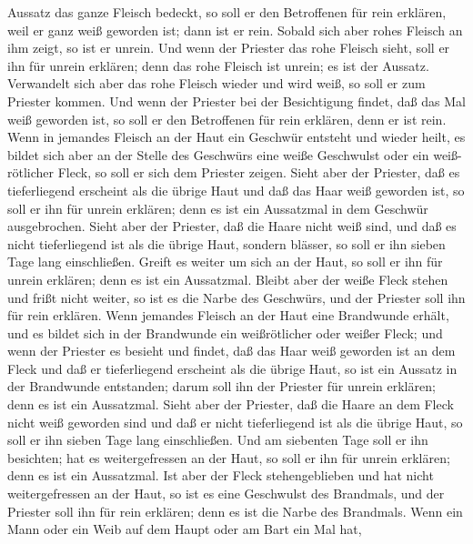 Aussatz das ganze Fleisch bedeckt, so soll er den Betroffenen für rein
erklären, weil er ganz weiß geworden ist; dann ist er rein.
 Sobald sich aber rohes Fleisch an ihm zeigt, so ist er
unrein.  Und wenn der Priester das rohe Fleisch sieht,
soll er ihn für unrein erklären; denn das rohe Fleisch ist unrein; es
ist der Aussatz.  Verwandelt sich aber das rohe Fleisch
wieder und wird weiß, so soll er zum Priester kommen. 
Und wenn der Priester bei der Besichtigung findet, daß das Mal weiß
geworden ist, so soll er den Betroffenen für rein erklären, denn er ist
rein.  Wenn in jemandes Fleisch an der Haut ein Geschwür
entsteht und wieder heilt,  es bildet sich aber an der
Stelle des Geschwürs eine weiße Geschwulst oder ein weiß-rötlicher
Fleck, so soll er sich dem Priester zeigen.  Sieht aber
der Priester, daß es tieferliegend erscheint als die übrige Haut und daß
das Haar weiß geworden ist, so soll er ihn für unrein erklären; denn es
ist ein Aussatzmal in dem Geschwür ausgebrochen.  Sieht
aber der Priester, daß die Haare nicht weiß sind, und daß es nicht
tieferliegend ist als die übrige Haut, sondern blässer, so soll er ihn
sieben Tage lang einschließen.  Greift es weiter um sich
an der Haut, so soll er ihn für unrein erklären; denn es ist ein
Aussatzmal.  Bleibt aber der weiße Fleck stehen und frißt
nicht weiter, so ist es die Narbe des Geschwürs, und der Priester soll
ihn für rein erklären.  Wenn jemandes Fleisch an der Haut
eine Brandwunde erhält, und es bildet sich in der Brandwunde ein
weißrötlicher oder weißer Fleck;  und wenn der Priester
es besieht und findet, daß das Haar weiß geworden ist an dem Fleck und
daß er tieferliegend erscheint als die übrige Haut, so ist ein Aussatz
in der Brandwunde entstanden; darum soll ihn der Priester für unrein
erklären; denn es ist ein Aussatzmal.  Sieht aber der
Priester, daß die Haare an dem Fleck nicht weiß geworden sind und daß er
nicht tieferliegend ist als die übrige Haut, so soll er ihn sieben Tage
lang einschließen.  Und am siebenten Tage soll er ihn
besichten; hat es weitergefressen an der Haut, so soll er ihn für unrein
erklären; denn es ist ein Aussatzmal.  Ist aber der Fleck
stehengeblieben und hat nicht weitergefressen an der Haut, so ist es
eine Geschwulst des Brandmals, und der Priester soll ihn für rein
erklären; denn es ist die Narbe des Brandmals.  Wenn ein
Mann oder ein Weib auf dem Haupt oder am Bart ein Mal hat,
